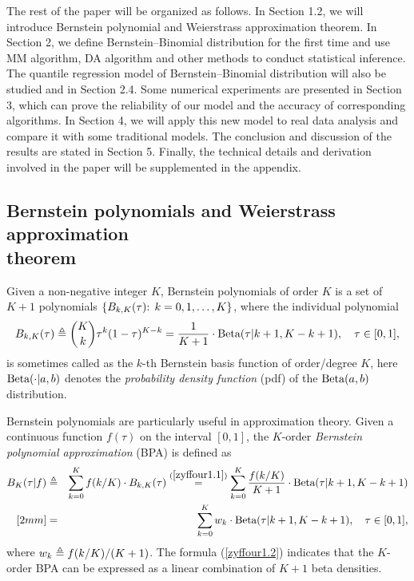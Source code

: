The rest of the paper will be organized as follows. In Section 1.2, we will introduce Bernstein polynomial and Weierstrass approximation theorem. In Section 2, we define Bernstein--Binomial distribution for the first time and use MM algorithm, DA algorithm and other methods to conduct statistical inference. The quantile regression model of Bernstein--Binomial distribution will also be studied and in Section 2.4. Some numerical experiments are presented in Section 3, which can prove the reliability of our model and the accuracy of corresponding algorithms. In Section 4, we will apply this new model to real data analysis and compare it with some traditional models. The conclusion and discussion of the results are stated in Section 5. Finally, the technical details and derivation involved in the paper will be supplemented in the appendix.


\subsection{Bernstein polynomials and Weierstrass approximation \\ theorem}     %

Given a non-negative integer $K$, Bernstein polynomials of order $K$ is a set of $K+1$ polynomials $\{B_{k,K}(\tau)\mbox{: } k =0, 1, \dots, K\}$, where the individual polynomial
\begin{eqnarray} \label{zyffour1.1}
   B_{k,K}(\tau) \triangleq  \binom{K}{k} \tau^k (1-\tau)^{K-k}
   = \frac{1}{K+1} \cdot \mbox{Beta}(\tau| k+1, K-k+1), \quad \tau \in [0,1],
\end{eqnarray}
is sometimes called as the $k$-th Bernstein basis function of order/degree $K$, here $\mbox{Beta}(\cdot|a,b)$ denotes the \textit{probability density function} (pdf) of the $\mbox{Beta}(a, b)$ distribution. %

Bernstein polynomials are particularly useful in approximation theory.
Given a continuous function $f(\tau)$ on the interval $[0,1]$, the $K$-order \textit{Bernstein polynomial approximation} (BPA) is defined as
\begin{eqnarray}  \label{zyffour1.2}
   B_K(\tau|f) &\triangleq & \sum_{k=0}^K f(k/K) \cdot B_{k,K}(\tau)
   \stackrel{(\ref{zyffour1.1})}{=}  \sum_{k=0}^K  \frac{ f(k/K)}{K+1} \cdot \mbox{Beta}(\tau|k+1, K-k+1) \nonumber \\ [2mm]
   &=& \sum_{k=0}^K w_k \cdot \mbox{Beta}(\tau|k+1, K-k+1),  \quad \tau \in [0,1],
\end{eqnarray}
where $w_k \triangleq f(k/K)/(K+1)$. The formula (\ref{zyffour1.2}) indicates that the $K$-order BPA can be expressed as a linear combination of $K+1$ beta densities.

